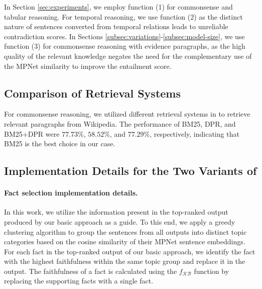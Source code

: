 In Section \ref{sec:experiments}, we employ function (1) for commonsense and tabular reasoning. For temporal reasoning, we use function (2) as the distinct nature of sentences converted from temporal relations leads to unreliable contradiction scores. In Sections \ref{subsec:variations}-\ref{subsec:model-size}, we use function (3) for commonsense reasoning with evidence paragraphs, as the high quality of the relevant knowledge negates the need for the complementary use of the MPNet similarity to improve the entailment score.


\subsection{Comparison of Retrieval Systems}
\label{subsec:retrieval-comparison}

For commonsense reasoning, we utilized different retrieval systems in \citet{karpukhin2020dense} to retrieve relevant paragraphs from Wikipedia. The performance of BM25, DPR, and BM25+DPR were $77.73\%$, $58.52\%$, and $77.29\%$, respectively, indicating that BM25 is the best choice in our case.

\iffalse
\subsection{Converting Temporal Relations to Sentences}
\label{subsec:temporal-templates}
\subsection{Converting Word Relations to Sentences}
\label{subsec:word-templates}
\fi

\subsection{Implementation Details for the Two Variants of \NAME{}}
\label{subsec:variants-implementation}

\paragraph{Fact selection implementation details.} In this work, we utilize the information present in the top-ranked output produced by our basic approach as a guide. To this end, we apply a greedy clustering algorithm to group the sentences from all outputs into distinct topic categories based on the cosine similarity of their MPNet sentence embeddings. For each fact in the top-ranked output of our basic approach, we identify the fact with the highest faithfulness within the same topic group and replace it in the output. The faithfulness of a fact is calculated using the $f_{\mathcal{KB}}$ function by replacing the supporting facts with a single fact.

